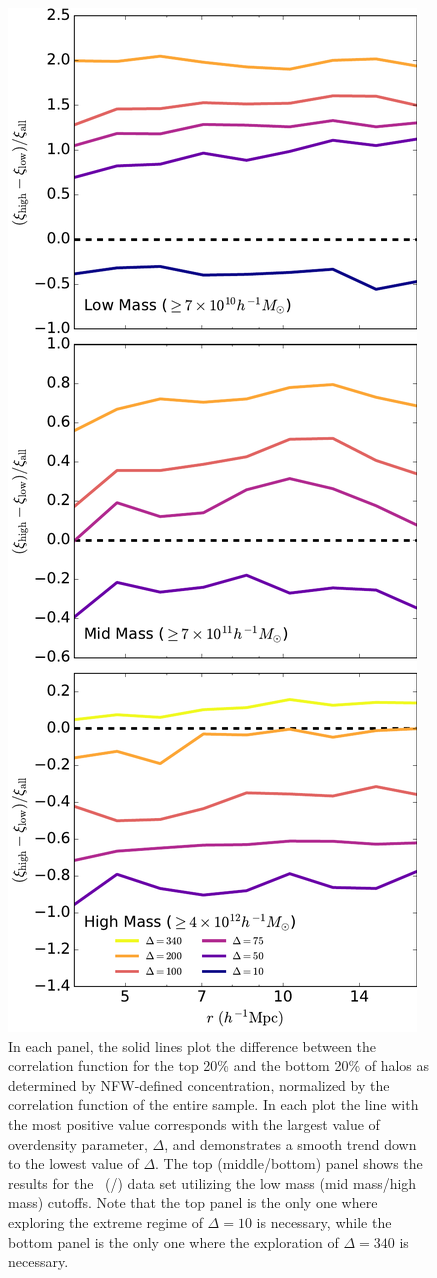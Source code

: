 \documentclass[usenatbib]{mnras}
\begin{document}
\begin{figure}
	\centering
	\includegraphics[width=.4\textwidth]{all_cfcompare_cnfw.pdf}
	\caption{
In each panel, the solid lines plot the difference between the correlation function for the top
20\% and the bottom 20\% of halos as determined by NFW-defined concentration, normalized by the
correlation function of the entire sample. In each plot the line with the most positive value
corresponds with the largest value of overdensity parameter, $\Delta$, and demonstrates a smooth
trend down to the lowest value of $\Delta$. The top (middle/bottom) panel shows the results for the
\simA \ (\simB /\simC) data set utilizing the low mass (mid mass/high mass) cutoffs. Note
that the top panel is the only one where exploring the extreme regime of $\Delta = 10$ is
necessary, while the bottom panel is the only one where the exploration of $\Delta = 340$
is necessary.}
\end{figure}
\end{document}
